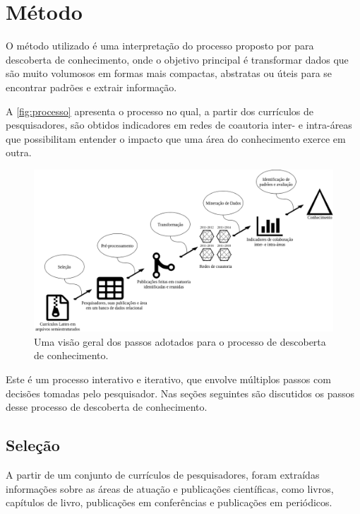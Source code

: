 \chapter[Método]{Método}

O método utilizado é uma interpretação do processo proposto por  para descoberta de conhecimento, onde o objetivo principal é transformar dados que são muito volumosos em formas mais compactas, abstratas ou úteis para se encontrar padrões e extrair informação.

A \autoref{fig:processo} apresenta o processo no qual, a partir dos currículos de pesquisadores, são obtidos indicadores em redes de coautoria inter- e intra-áreas que possibilitam entender o impacto que uma área do conhecimento exerce em outra.

\begin{figure}[htpb]
  \centering
  \includegraphics[scale=.3]{figuras/fayyad-diagram-graph}
  \caption{Uma visão geral dos passos adotados para o processo de descoberta de conhecimento.}
  \label{fig:processo}
\end{figure}

Este é um processo interativo e iterativo, que envolve múltiplos passos com decisões tomadas pelo pesquisador. Nas seções seguintes são discutidos os passos desse processo de descoberta de conhecimento.

\section{Seleção}

A partir de um conjunto de currículos de pesquisadores, foram extraídas informações sobre as áreas de atuação e publicações científicas, como livros, capítulos de livro, publicações em conferências e publicações em periódicos.

